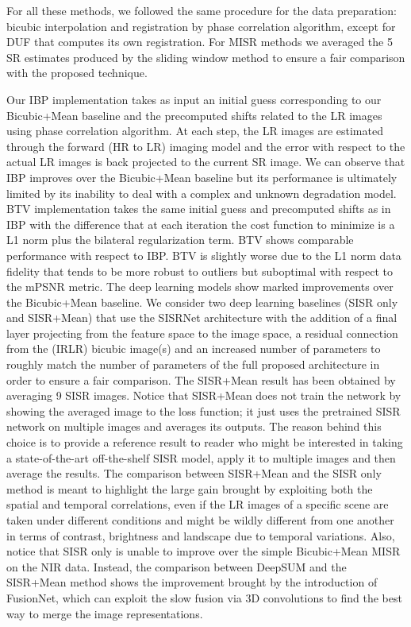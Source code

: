 \documentclass[journal]{IEEEtran}
\begin{document}
For all these methods, we followed the same procedure for the data preparation: bicubic interpolation and registration by phase correlation algorithm, except for DUF that computes its own registration. For MISR methods we averaged the 5 SR estimates produced by the sliding window method to ensure a fair comparison with the proposed technique. 

Our IBP implementation takes as input an initial guess corresponding to our Bicubic+Mean baseline and the precomputed shifts related to the LR images using phase correlation algorithm. At each step, the LR images are estimated through the forward (HR to LR) imaging model and the error with respect to the actual LR images is back projected to the current SR image. We can observe that IBP improves over the Bicubic+Mean baseline but its performance is ultimately limited by its inability to deal with a complex and unknown degradation model.
BTV implementation takes the same initial guess and precomputed shifts as in IBP with the difference that at each iteration the cost function to minimize is a L1 norm plus the bilateral regularization term. 
BTV shows comparable performance with respect to IBP. BTV is slightly worse due to the L1 norm data fidelity that tends to be more robust to outliers but suboptimal with respect to the mPSNR metric.
The deep learning models show marked improvements over the Bicubic+Mean baseline. We consider two deep learning baselines (SISR only and SISR+Mean) that use the SISRNet architecture with the addition of a final layer projecting from the feature space to the image space, a residual connection from the (IRLR) bicubic image(s) and an increased number of parameters to roughly match the number of parameters of the full proposed architecture in order to ensure a fair comparison. The SISR+Mean result has been obtained by averaging 9 SISR images. Notice that SISR+Mean does not train the network by showing the averaged image to the loss function; it just uses the pretrained SISR network on multiple images and averages its outputs. The reason behind this choice is to provide a reference result to reader who might be interested in taking a state-of-the-art off-the-shelf SISR model, apply it to multiple images and then average the results. The comparison between SISR+Mean and the SISR only method is meant to highlight the large gain brought by exploiting both the spatial and temporal correlations, even if the LR images of a specific scene are taken under different conditions and might be wildly different from one another in terms of contrast, brightness and landscape due to temporal variations. Also, notice that SISR only is unable to improve over the simple Bicubic+Mean MISR on the NIR data. Instead, the comparison between DeepSUM and the SISR+Mean method shows the improvement brought by the introduction of FusionNet, which can exploit the slow fusion via 3D convolutions to find the best way to merge the image representations.
\end{document}

